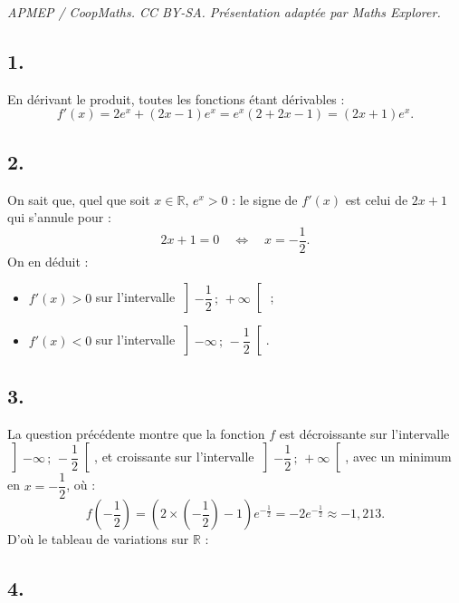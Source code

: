 \documentclass[10pt]{article}
\begin{document}
\noindent\textit{APMEP / CoopMaths. CC BY-SA. Présentation adaptée par Maths Explorer.}\par\medskip
\subsection*{1.}

En dérivant le produit, toutes les fonctions étant dérivables :
\[
f'(x) = 2 e^x + (2x - 1) e^x = e^x(2 + 2x - 1) = (2x + 1) e^x.
\]

\subsection*{2.}

On sait que, quel que soit \(x \in \mathbb{R}\), \(e^x > 0\) : le signe de \(f'(x)\) est celui de \(2x + 1\) qui s'annule pour :
\[
2x + 1 = 0 \quad \Longleftrightarrow \quad x = -\dfrac{1}{2}.
\]
On en déduit :
\begin{itemize}
    \item \(f'(x) > 0\) sur l'intervalle \(\left]-\dfrac{1}{2}\,;\,+\infty\right[\) ;
    \item \(f'(x) < 0\) sur l'intervalle \(\left]-\infty\,;\,-\dfrac{1}{2}\right[\).
\end{itemize}

\subsection*{3.}

La question précédente montre que la fonction \(f\) est décroissante sur l'intervalle \(\left]-\infty\,;\,-\dfrac{1}{2}\right[\), et croissante sur l'intervalle \(\left]-\dfrac{1}{2}\,;\,+\infty\right[\), avec un minimum en \(x = -\dfrac{1}{2}\), où :
\[
f\left(-\dfrac{1}{2}\right) = \left(2 \times \left(-\dfrac{1}{2}\right) - 1\right) e^{-\frac{1}{2}} = -2 e^{-\frac{1}{2}} \approx -1,213.
\]
D'où le tableau de variations sur \(\mathbb{R}\) :

\begin{center}
\end{center}

\subsection*{4.}
\end{document}
